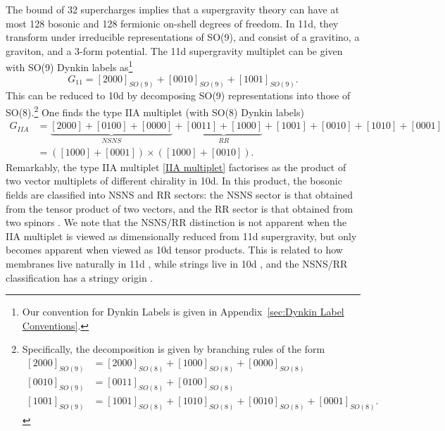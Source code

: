 The bound of 32 supercharges implies that a supergravity theory can have at most 128 bosonic and 128 fermionic on-shell degrees of freedom.
In 11d, they transform under irreducible representations of SO(9), and consist of a gravitino, a graviton, and a 3-form potential.
The 11d supergravity multiplet can be given with SO(9) Dynkin labels as\footnote{Our convention for Dynkin Labels is given in Appendix~\ref{sec:Dynkin Label Conventions}.}
\begin{equation}
G_{11} = [2000]_{SO(9)} + [0010]_{SO(9)} + [1001]_{SO(9)}.
\label{11d SUGRA multiplet}
\end{equation}
This can be reduced to 10d by decomposing SO(9) representations into those of SO(8).\footnote{
Specifically, the decomposition is given by branching rules of the form
\begin{equation}
\begin{aligned}
[2000]_{SO(9)} &= [2000]_{SO(8)} + [1000]_{SO(8)}+[0000]_{SO(8)}\\
[0010]_{SO(9)} &= [0011]_{SO(8)} + [0100]_{SO(8)}\\
[1001]_{SO(9)} &= [1001]_{SO(8)} + [1010]_{SO(8)}+[0010]_{SO(8)}+[0001]_{SO(8)}.
\end{aligned}
\end{equation}
}
One finds the type IIA multiplet (with SO(8) Dynkin labels)
\begin{equation}
\begin{aligned}
G_{IIA} 
&= \underbrace{[2000]+[0100]+[0000]}_{NSNS} + \underbrace{[0011] + [1000]}_{RR} + [1001] + [0010] + [1010] + [0001]\\
&=([1000] + [0001]) \times ([1000] + [0010]).
\end{aligned}
\label{IIA multiplet}
\end{equation}
Remarkably, the type IIA multiplet \eqref{IIA multiplet} factorises as the product of two vector multiplets of different chirality in 10d.
In this product, the bosonic fields are classified into NSNS and RR sectors: the NSNS sector is that obtained from the tensor product of two vectors, and the RR sector is that obtained from two spinors \cite{Polchinski:1998rr}.
We note that the NSNS/RR distinction is not apparent when the IIA multiplet is viewed as dimensionally reduced from 11d supergravity, but only becomes apparent when viewed as 10d tensor products.
This is related to how membranes live naturally in 11d \cite{Bergshoeff:1987cm}, while strings live in 10d \cite{Green:2012oqa}, and the NSNS/RR classification has a stringy origin \cite{Polchinski:1995mt}.

